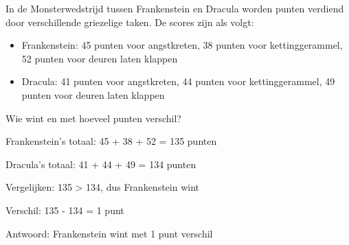 \begin{opgave}
In de Monsterwedstrijd tussen Frankenstein en Dracula worden punten verdiend 
door verschillende griezelige taken. De scores zijn als volgt:
\begin{itemize}
\item Frankenstein: 45 punten voor angstkreten, 38 punten voor kettinggerammel, 
52 punten voor deuren laten klappen
\item Dracula: 41 punten voor angstkreten, 44 punten voor kettinggerammel, 
49 punten voor deuren laten klappen
\end{itemize}
Wie wint en met hoeveel punten verschil?
\end{opgave}

\begin{oplossing}
Frankenstein's totaal:
45 + 38 + 52 = 135 punten

Dracula's totaal:
41 + 44 + 49 = 134 punten

Vergelijken:
135 > 134, dus Frankenstein wint

Verschil:
135 - 134 = 1 punt

Antwoord: Frankenstein wint met 1 punt verschil
\end{oplossing}